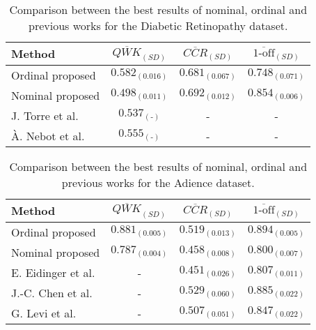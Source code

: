 \documentclass[journal]{IEEEtran}
\begin{document}
	\begin{table}[!t]
		\caption{Comparison between the best results of nominal, ordinal and previous works for the Diabetic Retinopathy dataset.}
		\label{table:ComparisonDR}
		\scriptsize
		\centering
		\def\arraystretch{1.3}
		\begin{tabular}{l|ccc}
			Method                                   & $\overline{QWK}_{(SD)}$ & $\overline{CCR}_{(SD)}$ & $\overline{\text{1-off}}_{(SD)}$ \\ \hline
			Ordinal proposed                         &    $0.582_{(0.016)}$    &    $0.681_{(0.067)}$    &        $0.748_{(0.071)}$         \\
			Nominal proposed                         &    $0.498_{(0.011)}$    &    $0.692_{(0.012)}$    &        $0.854_{(0.006)}$         \\ \hline
			J. Torre et al. \cite{de2018weighted}    &      $0.537_{(\text{-})}$      &            -            &                -                 \\
			À. Nebot et al. \cite{nebot2016diabetic} &      $0.555_{(\text{-})}$      &            -            &                -
		\end{tabular}
	\end{table}
	
	\begin{table}[!t]
		\caption{Comparison between the best results of nominal, ordinal and previous works for the Adience dataset.}
		\label{table:ComparisonAdience}
		\scriptsize
		\centering
		\def\arraystretch{1.3}
		\begin{tabular}{l|ccc}
			Method                                    & $\overline{QWK}_{(SD)}$ & $\overline{CCR}_{(SD)}$ & $\overline{\text{1-off}}_{(SD)}$ \\ \hline
			Ordinal proposed                          &    $0.881_{(0.005)}$    &    $0.519_{(0.013)}$    &        $0.894_{(0.005)}$         \\
			Nominal proposed                          &    $0.787_{(0.004)}$    &    $0.458_{(0.008)}$    &        $0.800_{(0.007)}$         \\ \hline
			E. Eidinger et al. \cite{eidinger2014age} &            -            &    $0.451_{(0.026)}$    &        $0.807_{(0.011)}$         \\
			J.-C. Chen et al. \cite{chen2016cascaded} &            -            &    $0.529_{(0.060)}$    &        $0.885_{(0.022)}$         \\
			G. Levi et al. \cite{levi2015age}         &            -            &    $0.507_{(0.051)}$    &        $0.847_{(0.022)}$
		\end{tabular}
	\end{table}
	
\end{document}
